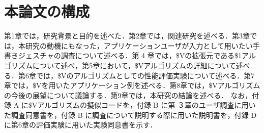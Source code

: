 \section{本論文の構成}
第1章では，研究背景と目的を述べた．第2章では，関連研究を述べる．第3章では，本研究の動機にもなった，アプリケーションユーザが入力として用いたい手書きジェスチャの調査について述べる．第 4 章では，\$Vの拡張元である\$1アルゴリズムについて述べ，第5章において，\$Vアルゴリズムの詳細について述べる．第6章では，\$Vのアルゴリズムとしての性能評価実験について述べる．第7章では，\$Vを用いたアプリケーション例を述べる．第8章では，\$Vアルゴリズムの今後の展望について議論する．第9章では，本研究の結論を述べる．
なお，付録 A に\$Vアルゴリズムの擬似コードを，付録 B に第 ３章のユーザ調査に用いた調査同意書を，付録 B に調査について説明する際に用いた説明書を，付録 Dに第6章の評価実験に用いた実験同意書を示す．
